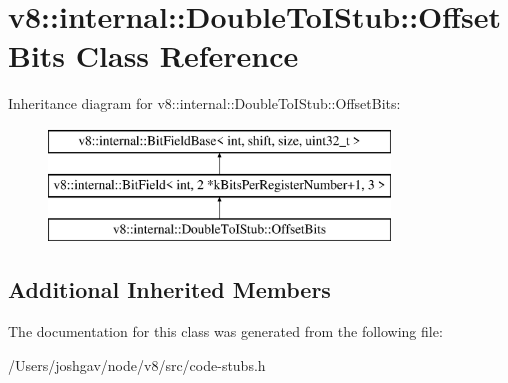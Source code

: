 \hypertarget{classv8_1_1internal_1_1_double_to_i_stub_1_1_offset_bits}{}\section{v8\+:\+:internal\+:\+:Double\+To\+I\+Stub\+:\+:Offset\+Bits Class Reference}
\label{classv8_1_1internal_1_1_double_to_i_stub_1_1_offset_bits}
Inheritance diagram for v8\+:\+:internal\+:\+:Double\+To\+I\+Stub\+:\+:Offset\+Bits\+:\begin{figure}[H]
\begin{center}
\leavevmode
\includegraphics[height=3.000000cm]{classv8_1_1internal_1_1_double_to_i_stub_1_1_offset_bits}
\end{center}
\end{figure}
\subsection*{Additional Inherited Members}


The documentation for this class was generated from the following file\+:\begin{DoxyCompactItemize}
\item 
/\+Users/joshgav/node/v8/src/code-\/stubs.\+h\end{DoxyCompactItemize}
